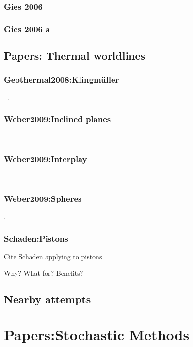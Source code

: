 \subsubsection{Gies 2006}
\cite{Gies2006}

\subsubsection{Gies 2006 a}

\cite{Gies2006a}

\subsection{Papers: Thermal worldlines}

\subsubsection{Geothermal2008:Klingm\"uller}
~\cite{Klingmueller2008}.  
\subsubsection{Weber2009:Inclined planes}
~\cite{Weber2009}
\subsubsection{Weber2009:Interplay}
~\cite{Weber2010}
\subsubsection{Weber2009:Spheres}
\cite{Weber2010a}.  

\subsubsection{Schaden:Pistons}

Cite Schaden applying to pistons\cite{Schaden2009}

Why?  What for?  Benefits?

\subsection{Nearby attempts}

\cite{Aehlig2011}

\cite{Maggs2006, Pasquali2008}

\section{Papers:Stochastic Methods}

